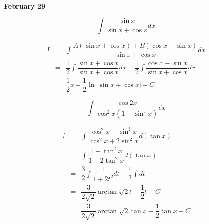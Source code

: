 \textcolor{purplea}{\textbf{February 29}}
\begin{example}[][Exam: 28.4.15]
	$$\int\dfrac{\sin x}{\sin x+\cos x}dx$$
\end{example}
\begin{solution}
	\begin{eqnarray*}
		I & = & \int\dfrac{A(\sin x + \cos x) + B(\cos  x-\sin x)}{\sin x+\cos x}dx\\
		  & = & \dfrac{1}{2}\int\dfrac{\sin x+\cos x}{\sin x+\cos x}dx - \dfrac{1}{2}\int \dfrac{\cos x-\sin x}{\sin x+\cos x}dx\\
		  & = & \dfrac{1}{2}x - \dfrac{1}{2}\ln|\sin x+\cos x| + C
	\end{eqnarray*}
\end{solution}

\begin{example}[][Exam: 28.4.16]
	$$\int\dfrac{\cos 2x}{\cos^{2} x(1+\sin^{2} x)}dx$$
\end{example}
\begin{solution}
	\begin{eqnarray*}
		I & = & \int\dfrac{\cos^{2} x-\sin^{2} x}{\cos^{2} x+2\sin^{2} x}d(\tan x)\\
		  & = & \int\dfrac{1-\tan^{2}x}{1+2\tan^{2} x}d(\tan x)\\
		  & = & \dfrac{3}{2}\int \dfrac{1}{1+2t^{2}}dt - \dfrac{1}{2}\int dt\\
		  & = & \dfrac{3}{2\sqrt{2}}\arctan \sqrt{2}t - \dfrac{1}{2}t + C\\
		  & = & \dfrac{3}{2\sqrt{2}}\arctan \sqrt{2}\tan x - \dfrac{1}{2}\tan x + C
	\end{eqnarray*}
\end{solution}

